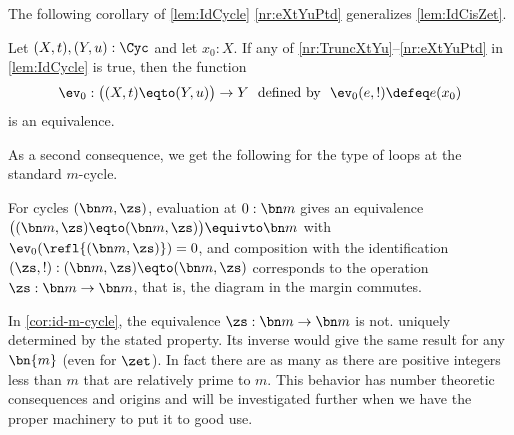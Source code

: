 The following corollary of \cref{lem:IdCycle} \ref{nr:eXtYuPtd}
generalizes \cref{lem:IdCisZet}.

\begin{corollary}\label{cor:ConnCycles}
  Let $(X,t),(Y,u):\Cyc$ and let $x_0:X$.
  If any of \ref{nr:TruncXtYu}--\ref{nr:eXtYuPtd} in \cref{lem:IdCycle} is
  true, then the function
  \[
    \ev_0:\bigl((X,t)\eqto(Y,u)\bigr)\to Y
    \text{~~defined by~~} \ev_0(e,!) \defeq e(x_0)
  \]
  is an equivalence.
\end{corollary}

As a second consequence,
we get the following for the type of loops at the standard $m$-cycle.
\begin{corollary}\label{cor:id-m-cycle}
  For cycles $(\bn m,\zs)$,
  evaluation at $0:\bn m$ gives an equivalence
  $\bigl((\bn m,\zs)\eqto(\bn m,\zs)\bigr) \equivto \bn m$
  with $\ev_0(\refl{(\bn m,\zs)}) = 0$, and
  composition with the identification
$(\zs,!): (\bn m,\zs)\eqto(\bn m,\zs)$
  corresponds to the operation $\zs:\bn m\to\bn m$,
  that is, the diagram in the margin commutes.
\end{corollary}

\begin{remark}\label{rem:thenonuniquenessofgeneratorsofmodulararithmetic1}
  In \cref{cor:id-m-cycle}, the equivalence $\zs:\bn m\to\bn m$ is not.
  uniquely determined by the stated property. Its inverse would give the
  same result for any $\bn{m}$ (even for $\zet$). In fact there are
  as many as there are positive integers less than
  $m$ that are relatively prime to $m$.  This behavior has number theoretic
  consequences and origins and will be investigated further when we
  have the proper machinery to put it to good use.
\end{remark}

